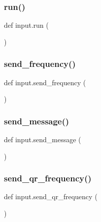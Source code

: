 \mbox{\label{namespaceinput_acf8fe4c0bb6a777022f311c22f311770}} 
\subsubsection{\texorpdfstring{run()}{run()}}
{\footnotesize\ttfamily def input.\+run (\begin{DoxyParamCaption}{ }\end{DoxyParamCaption})}

\mbox{\label{namespaceinput_a0e027bacb0e23962a92058b4de7df02d}} 
\subsubsection{\texorpdfstring{send\+\_\+frequency()}{send\_frequency()}}
{\footnotesize\ttfamily def input.\+send\+\_\+frequency (\begin{DoxyParamCaption}{ }\end{DoxyParamCaption})}

\mbox{\label{namespaceinput_a93769ba24482b0fb5fb527f7e6b9e98f}} 
\subsubsection{\texorpdfstring{send\+\_\+message()}{send\_message()}}
{\footnotesize\ttfamily def input.\+send\+\_\+message (\begin{DoxyParamCaption}{ }\end{DoxyParamCaption})}

\mbox{\label{namespaceinput_a03ee62d50c865b3932ded679640747c9}} 
\subsubsection{\texorpdfstring{send\+\_\+qr\+\_\+frequency()}{send\_qr\_frequency()}}
{\footnotesize\ttfamily def input.\+send\+\_\+qr\+\_\+frequency (\begin{DoxyParamCaption}{ }\end{DoxyParamCaption})}



